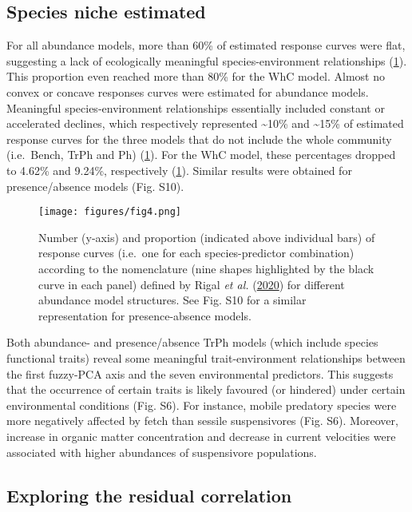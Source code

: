 \documentclass[9pt,biorxiv,doublespacing,lineno]{lapreprint}
\begin{document}
\hypertarget{species-niche-estimated}{%
\subsection{Species niche estimated}\label{species-niche-estimated}}

For all abundance models, more than 60\% of estimated response curves
were flat, suggesting a lack of ecologically meaningful
species-environment relationships (\cref{fig:fig4}). This proportion
even reached more than 80\% for the WhC model. Almost no convex or
concave responses curves were estimated for abundance models. Meaningful
species-environment relationships essentially included constant or
accelerated declines, which respectively represented \textasciitilde10\%
and \textasciitilde15\% of estimated response curves for the three
models that do not include the whole community (i.e.~Bench, TrPh and Ph)
(\cref{fig:fig4}). For the WhC model, these percentages dropped to
4.62\% and 9.24\%, respectively (\cref{fig:fig4}). Similar results were
obtained for presence/absence models (Fig. S10).

\begin{figure}
\hypertarget{fig:fig4}{%
\centering
\texttt{[image: figures/fig4.png]}
\caption{Number (y-axis) and proportion (indicated above individual
bars) of response curves (i.e.~one for each species-predictor
combination) according to the nomenclature (nine shapes highlighted by
the black curve in each panel) defined by Rigal \emph{et al.}
(\protect\hyperlink{ref-Rigal_2020}{2020}) for different abundance model
structures. See Fig. S10 for a similar representation for
presence-absence models.}\label{fig:fig4}
}
\end{figure}

Both abundance- and presence/absence TrPh models (which include species
functional traits) reveal some meaningful trait-environment
relationships between the first fuzzy-PCA axis and the seven
environmental predictors. This suggests that the occurrence of certain
traits is likely favoured (or hindered) under certain environmental
conditions (Fig. S6). For instance, mobile predatory species were more
negatively affected by fetch than sessile suspensivores (Fig. S6).
Moreover, increase in organic matter concentration and decrease in
current velocities were associated with higher abundances of
suspensivore populations.

\hypertarget{exploring-the-residual-correlation}{%
\subsection{Exploring the residual
correlation}\label{exploring-the-residual-correlation}}
\end{document}
